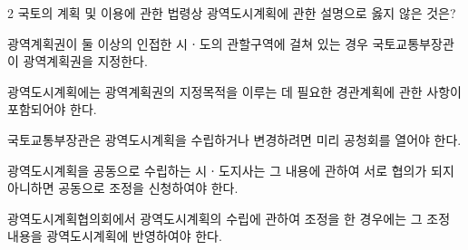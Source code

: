 \begin{question}{2}
국토의 계획 및 이용에 관한 법령상 광역도시계획에 관한 설명으로 옳지 않은 것은?
\begin{choices}
  \item 광역계획권이 둘 이상의 인접한 시ㆍ도의 관할구역에 걸쳐 있는 경우 국토교통부장관이 광역계획권을 지정한다.
  \item 광역도시계획에는 광역계획권의 지정목적을 이루는 데 필요한 경관계획에 관한 사항이 포함되어야 한다.
  \item 국토교통부장관은 광역도시계획을 수립하거나 변경하려면 미리 공청회를 열어야 한다.
  \item 광역도시계획을 공동으로 수립하는 시ㆍ도지사는 그 내용에 관하여 서로 협의가 되지 아니하면 공동으로 조정을 신청하여야 한다.
  \item 광역도시계획협의회에서 광역도시계획의 수립에 관하여 조정을 한 경우에는 그 조정 내용을 광역도시계획에 반영하여야 한다.
\end{choices}
\end{question}
